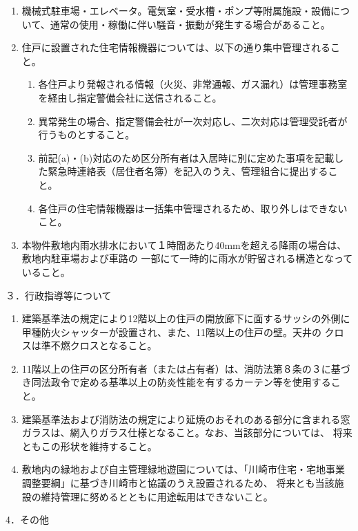\documentclass[
  luatex,
  paper=a4paper,
  fontsize=11pt,
  jafontsize=10pt,
  jlreq_notes,
]{jlreq}
\begin{document}
  \begin{enumerate}
  \item 機械式駐車場・エレベータ。電気室・受水槽・ポンプ等附属施設・設備について、通常の使用・稼働に伴い騒音・振動が発生する場合があること。
  \item 住戸に設置された住宅情報機器については、以下の通り集中管理されること。
  \begin{enumerate}
        \item 各住戸より発報される情報（火災、非常通報、ガス漏れ）は管理事務室を経由し指定警備会社に送信されること。
        \item 異常発生の場合、指定警備会社が一次対応し、二次対応は管理受託者が行うものとすること。
        \item 前記(a)・(b)対応のため区分所有者は入居時に別に定めた事項を記載した緊急時連絡表（居住者名簿）を記入のうえ、管理組合に提出すること。
        \item 各住戸の住宅情報機器は一括集中管理されるため、取り外しはできないこと。
  \end{enumerate}
  \item 本物件敷地内雨水排水において１時間あたり40mmを超える降雨の場合は、敷地内駐車場および車路の
        一部にて一時的に雨水が貯留される構造となっていること。
  \end{enumerate}
  ３．行政指導等について
  \begin{enumerate}
  \item 建築基準法の規定により12階以上の住戸の開放廊下に面するサッシの外側に甲種防火シャッターが設置され、また、11階以上の住戸の壁。天井の クロスは準不燃クロスとなること。
  \item 11階以上の住戸の区分所有者（または占有者）は、消防法第８条の３に基づき同法政令で定める基準以上の防炎性能を有するカーテン等を使用すること。
  \item 建築基準法および消防法の規定により延焼のおそれのある部分に含まれる窓ガラスは、網入りガラス仕様となること。なお、当該部分については、
        将来ともこの形状を維持すること。
  \item 敷地内の緑地および自主管理緑地遊園については、「川崎市住宅・宅地事業調整要綱」に基づき川崎市と協議のうえ設置されるため、
        将来とも当該施設の維持管理に努めるとともに用途転用はできないこと。
  \end{enumerate}
  4．その他
\end{document}
